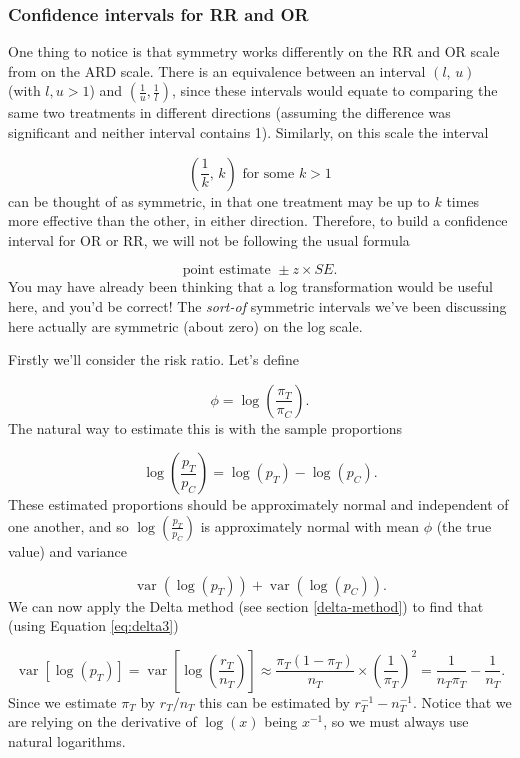 \documentclass[
  openany]{book}
\theoremstyle{definition}
\theoremstyle{definition}
\theoremstyle{definition}
\theoremstyle{definition}
\theoremstyle{remark}
\begin{document}
\hypertarget{ci-rr}{%
\subsubsection{Confidence intervals for RR and OR}\label{ci-rr}}

One thing to notice is that symmetry works differently on the RR and OR scale from on the ARD scale. There is an equivalence between an interval \(\left(l,\,u\right)\) (with \(l,u>1\)) and \(\left(\frac{1}{u},\frac{1}{l}\right)\), since these intervals would equate to comparing the same two treatments in different directions (assuming the difference was significant and neither interval contains 1). Similarly, on this scale the interval

\[\left(\frac{1}{k},\,k\right) \text{ for some }k>1 \]
can be thought of as symmetric, in that one treatment may be up to \(k\) times more effective than the other, in either direction. Therefore, to build a confidence interval for OR or RR, we will not be following the usual formula

\[\text{point estimate } \pm{z\times{SE}}.\]
You may have already been thinking that a log transformation would be useful here, and you'd be correct! The \emph{sort-of} symmetric intervals we've been discussing here actually are symmetric (about zero) on the log scale.

Firstly we'll consider the risk ratio. Let's define

\[ \phi = \log\left(\frac{\pi_T}{\pi_C}\right).\]
The natural way to estimate this is with the sample proportions

\[\log\left(\frac{p_T}{p_C}\right) = \log\left(p_T\right) - \log\left(p_C\right).\]
These estimated proportions should be approximately normal and independent of one another, and so \(\log\left(\frac{p_T}{p_C}\right)\) is approximately normal with mean \(\phi\) (the true value) and variance

\[\operatorname{var}\left(\log\left(p_T\right)\right) + \operatorname{var}\left(\log\left(p_C\right)\right). \]
We can now apply the Delta method (see section \ref{delta-method}) to find that (using Equation \eqref{eq:delta3})

\[\operatorname{var}\left[\log\left(p_T\right)\right] = \operatorname{var}\left[\log\left(\frac{r_T}{n_T}\right)\right] \approx \frac{\pi_T\left(1-\pi_T\right)}{n_T}\times{\left(\frac{1}{\pi_T}\right)^2} = \frac{1}{n_T\pi_T} - \frac{1}{n_T}. \]
Since we estimate \(\pi_T\) by \(r_T/n_T\) this can be estimated by \(r_T^{-1} - n_T^{-1}\). Notice that we are relying on the derivative of \(\log\left(x\right)\) being \(x^{-1}\), so we must always use natural logarithms.
\end{document}
